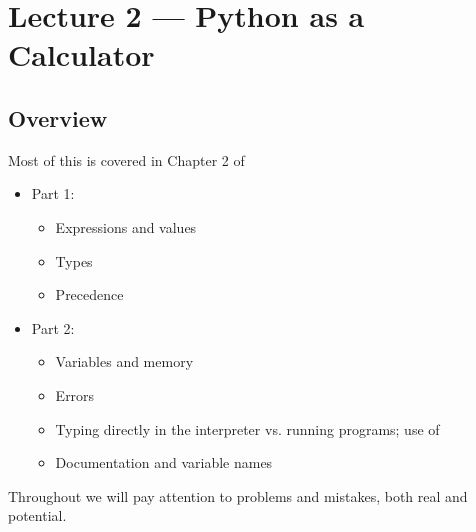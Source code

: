 \documentclass[letterpaper,10pt,english]{sphinxmanual}
\begin{document}
\chapter{Lecture 2 — Python as a Calculator}
\label{\detokenize{lecture_notes/lec02_calculator:lecture-2-python-as-a-calculator}}\label{\detokenize{lecture_notes/lec02_calculator::doc}}

\section{Overview}
\label{\detokenize{lecture_notes/lec02_calculator:overview}}
Most of this is covered in Chapter 2 of 
\begin{itemize}
\item {} 
Part 1:
\begin{itemize}
\item {} 
Expressions and values

\item {} 
Types

\item {} 
Precedence

\end{itemize}

\item {} 
Part 2:
\begin{itemize}
\item {} 
Variables and memory

\item {} 
Errors

\item {} 
Typing directly in the interpreter vs. running programs; use of 

\item {} 
Documentation and variable names

\end{itemize}

\end{itemize}

Throughout we will pay attention to problems and mistakes, both real and
potential.
\end{document}
